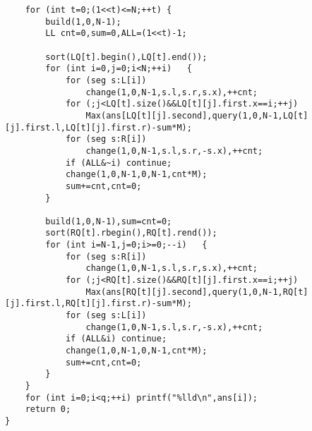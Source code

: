 \documentclass[6pt]{article}
\begin{document}
\begin{multicols}{2}
\begin{lstlisting}
    for (int t=0;(1<<t)<=N;++t) {
        build(1,0,N-1);
        LL cnt=0,sum=0,ALL=(1<<t)-1;
        
        sort(LQ[t].begin(),LQ[t].end());
        for (int i=0,j=0;i<N;++i)   {
            for (seg s:L[i])
                change(1,0,N-1,s.l,s.r,s.x),++cnt;
            for (;j<LQ[t].size()&&LQ[t][j].first.x==i;++j)
                Max(ans[LQ[t][j].second],query(1,0,N-1,LQ[t][j].first.l,LQ[t][j].first.r)-sum*M);
            for (seg s:R[i])
                change(1,0,N-1,s.l,s.r,-s.x),++cnt;
            if (ALL&~i) continue;
            change(1,0,N-1,0,N-1,cnt*M);
            sum+=cnt,cnt=0;
        }

        build(1,0,N-1),sum=cnt=0;
        sort(RQ[t].rbegin(),RQ[t].rend());
        for (int i=N-1,j=0;i>=0;--i)   {
            for (seg s:R[i])
                change(1,0,N-1,s.l,s.r,s.x),++cnt;
            for (;j<RQ[t].size()&&RQ[t][j].first.x==i;++j)
                Max(ans[RQ[t][j].second],query(1,0,N-1,RQ[t][j].first.l,RQ[t][j].first.r)-sum*M);
            for (seg s:L[i])
                change(1,0,N-1,s.l,s.r,-s.x),++cnt;
            if (ALL&i) continue;
            change(1,0,N-1,0,N-1,cnt*M);
            sum+=cnt,cnt=0;
        }
    }
    for (int i=0;i<q;++i) printf("%lld\n",ans[i]);
    return 0;
}
\end{lstlisting}

\end{multicols}
\end{document}

